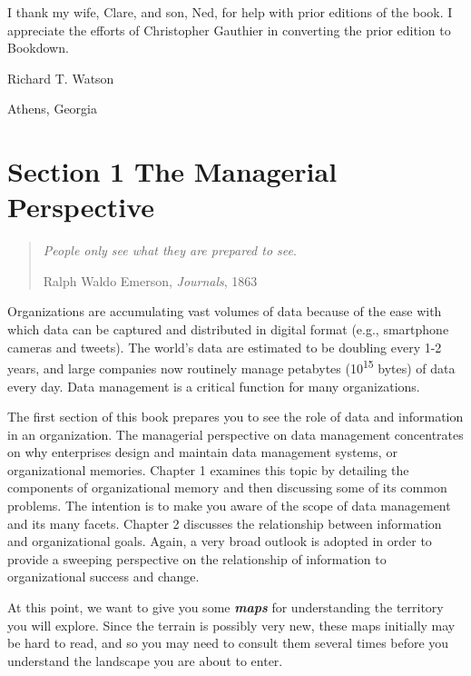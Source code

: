 \documentclass[
]{article}
\begin{document}
I thank my wife, Clare, and son, Ned, for help with prior editions of
the book. I appreciate the efforts of Christopher Gauthier in converting
the prior edition to Bookdown.

Richard T. Watson

Athens, Georgia

\newpage
\setcounter{tocdepth}{1}
\tableofcontents
\newpage

\hypertarget{section-1-the-managerial-perspective}{%
\section*{Section 1 The Managerial Perspective}\label{section-1-the-managerial-perspective}}

\begin{quote}
\emph{People only see what they are prepared to see}.

Ralph Waldo Emerson, \emph{Journals}, 1863
\end{quote}

Organizations are accumulating vast volumes of data because of the ease
with which data can be captured and distributed in digital format (e.g.,
smartphone cameras and tweets). The world's data are estimated to be
doubling every 1-2 years, and large companies now routinely manage
petabytes (10\textsuperscript{15} bytes) of data every day. Data management is a
critical function for many organizations.

The first section of this book prepares you to see the role of data and
information in an organization. The managerial perspective on data
management concentrates on why enterprises design and maintain data
management systems, or organizational memories. Chapter 1 examines this
topic by detailing the components of organizational memory and then
discussing some of its common problems. The intention is to make you
aware of the scope of data management and its many facets. Chapter 2
discusses the relationship between information and organizational goals.
Again, a very broad outlook is adopted in order to provide a sweeping
perspective on the relationship of information to organizational success
and change.

At this point, we want to give you some \textbf{\emph{maps}} for understanding the
territory you will explore. Since the terrain is possibly very new,
these maps initially may be hard to read, and so you may need to consult
them several times before you understand the landscape you are about to
enter.
\end{document}
